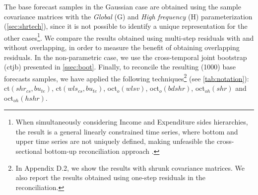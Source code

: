 \documentclass[12pt]{article}
\theoremstyle{definition}
\begin{document}
The base forecast samples in the Gaussian case are obtained using the sample covariance matrices with the \textit{Global} (G) and \textit{High frequency} (H) parameterization (\autoref{sec:shrtech}), since it is not possible to identify a unique representation for the other cases\footnote{When simultaneously considering Income and Expenditure sides hierarchies, the result is a general linearly constrained time series, where bottom and upper time series are not uniquely defined, making unfeasible the cross-sectional bottom-up reconciliation approach \citep{giro2022}.}. We compare the results obtained using multi-step residuals with and without overlapping, in order to measure the benefit of obtaining overlapping residuals. In the non-parametric case, we use the cross-temporal joint bootstrap (ctjb) presented in \autoref{ssec:boot}. Finally, to reconcile the resulting (1000) base forecasts samples, we have applied the following techniques\footnote{In Appendix D.2, we show the results with shrunk covariance matrices. We also report the results obtained using one-step residuals in the reconciliation.} (see \autoref{tab:notation}): ct$(shr_{cs}, bu_{te})$, ct$(wls_{cs}, bu_{te})$, oct$_o(wlsv)$, oct$_o(bdshr)$, oct$_{oh}(shr)$ and oct$_{oh}(hshr)$.
\end{document}
